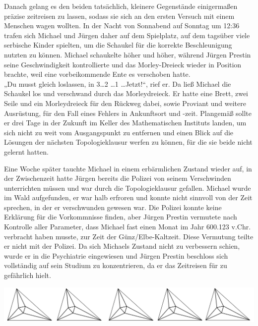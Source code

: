 \documentclass[oneside]{memoir}
\newcommand{\parasep}{
\bigskip
\bigskip
\begin{center} 
   \includegraphics[scale=.08]{parasep5.jpg} 
\end{center}
\bigskip
\bigskip
}
\begin{document}
Danach gelang es den beiden tatsächlich, kleinere Gegenstände einigermaßen präzise zeitreisen zu lassen, sodass sie sich an den ersten Versuch mit einem Menschen wagen wollten. In der Nacht von Sonnabend auf Sonntag um 12:36 trafen sich Michael und Jürgen daher auf dem Spielplatz, auf dem tagsüber viele serbische Kinder spielten, um die Schaukel für die korrekte Beschleunigung nutzten zu können. Michael schaukelte höher und höher, während Jürgen Prestin seine Geschwindigkeit kontrollierte und das Morley-Dreieck wieder in Position brachte, weil eine vorbeikommende Ente es verschoben hatte. \\
„Du musst gleich loslassen, in 3\ldots 2 \ldots 1 \ldots Jetzt!“, rief er.  Da ließ Michael die Schaukel los und verschwand durch das Morleydreieck. Er hatte eine Brett, zwei Seile und ein Morleydreieck für den Rückweg dabei, sowie Proviant und weitere Ausrüstung, für den Fall eines Fehlers in Ankunftsort und -zeit. Plangemäß sollte er drei Tage in der Zukunft im Keller des Mathematischen Instituts landen, um sich nicht zu weit vom Ausgangspunkt zu entfernen und einen Blick auf die Lösungen der nächsten Topologieklausur werfen zu können, für die sie beide nicht gelernt hatten.
 
 Eine Woche später tauchte Michael in einem erbärmlichen Zustand wieder auf, in der Zwischenzeit hatte Jürgen bereits die Polizei von seinem Verschwinden unterrichten müssen und war durch die Topologieklausur gefallen. Michael wurde im Wald aufgefunden, er war halb erfroren und konnte nicht sinnvoll von der Zeit sprechen, in der er verschwunden gewesen war. Die Polizei konnte keine Erklärung für die Vorkommnisse finden, aber Jürgen Prestin vermutete nach Kontrolle aller Parameter, dass Michael fast einen Monat im Jahr 600.123 v.Chr.  verbracht haben musste, zur Zeit der Günz/Elbe-Kaltzeit. Diese Vermutung teilte er nicht mit der Polizei. Da sich Michaels Zustand nicht zu verbessern schien, wurde er in die  Psychiatrie eingewiesen und Jürgen Prestin beschloss sich vollständig auf sein Studium zu konzentrieren, da er das Zeitreisen für zu gefährlich hielt.
 
\parasep
\end{document}
